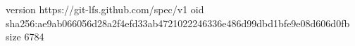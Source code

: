 version https://git-lfs.github.com/spec/v1
oid sha256:ae9ab066056d28a2f4efd33ab4721022246336e486d99dbd1bfe9e08d606d0fb
size 6784
